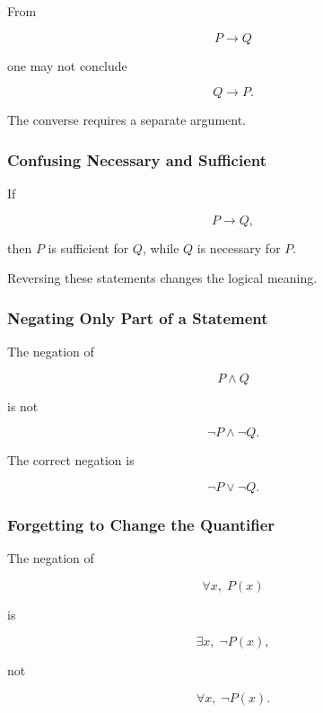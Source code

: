 From

\[ P\to Q \]

one may not conclude

\[ Q\to P. \]

The converse requires a separate argument.

\subsubsection{Confusing Necessary and Sufficient}
\label{subsec:error-necessary-sufficient}

If

\[ P\to Q, \]

then \(P\) is sufficient for \(Q\), while \(Q\) is necessary for \(P\).

Reversing these statements changes the logical meaning.

\subsubsection{Negating Only Part of a Statement}
\label{subsec:error-partial-negation}

The negation of

\[ P\land Q \]

is not

\[ \neg P\land\neg Q. \]

The correct negation is

\[ \neg P\lor\neg Q. \]

\subsubsection{Forgetting to Change the Quantifier}
\label{subsec:error-negating-quantifier}

The negation of

\[ \forall x,\;P(x) \]

is

\[ \exists x,\;\neg P(x), \]

not

\[ \forall x,\;\neg P(x). \]

